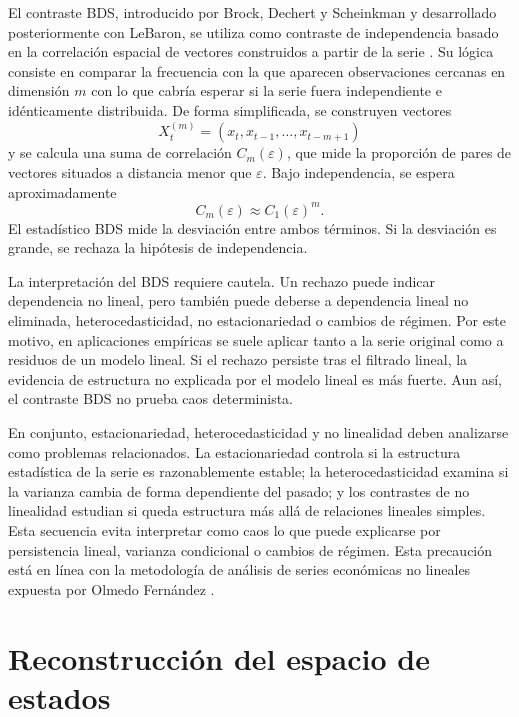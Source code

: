 El contraste BDS, introducido por Brock, Dechert y Scheinkman y desarrollado posteriormente con LeBaron, se utiliza como contraste de independencia basado en la correlación espacial de vectores construidos a partir de la serie \cite{brock1996}. Su lógica consiste en comparar la frecuencia con la que aparecen observaciones cercanas en dimensión \(m\) con lo que cabría esperar si la serie fuera independiente e idénticamente distribuida. De forma simplificada, se construyen vectores
\begin{equation}
    X_t^{(m)}=(x_t,x_{t-1},\ldots,x_{t-m+1})
\end{equation}
y se calcula una suma de correlación \(C_m(\varepsilon)\), que mide la proporción de pares de vectores situados a distancia menor que \(\varepsilon\). Bajo independencia, se espera aproximadamente
\begin{equation}
    C_m(\varepsilon) \approx C_1(\varepsilon)^m.
\end{equation}
El estadístico BDS mide la desviación entre ambos términos. Si la desviación es grande, se rechaza la hipótesis de independencia.

La interpretación del BDS requiere cautela. Un rechazo puede indicar dependencia no lineal, pero también puede deberse a dependencia lineal no eliminada, heterocedasticidad, no estacionariedad o cambios de régimen. Por este motivo, en aplicaciones empíricas se suele aplicar tanto a la serie original como a residuos de un modelo lineal. Si el rechazo persiste tras el filtrado lineal, la evidencia de estructura no explicada por el modelo lineal es más fuerte. Aun así, el contraste BDS no prueba caos determinista.

En conjunto, estacionariedad, heterocedasticidad y no linealidad deben analizarse como problemas relacionados. La estacionariedad controla si la estructura estadística de la serie es razonablemente estable; la heterocedasticidad examina si la varianza cambia de forma dependiente del pasado; y los contrastes de no linealidad estudian si queda estructura más allá de relaciones lineales simples. Esta secuencia evita interpretar como caos lo que puede explicarse por persistencia lineal, varianza condicional o cambios de régimen. Esta precaución está en línea con la metodología de análisis de series económicas no lineales expuesta por Olmedo Fernández \cite{olmedo2001}.

\section{Reconstrucción del espacio de estados}\label{sec:reconstruccion-espacio}


